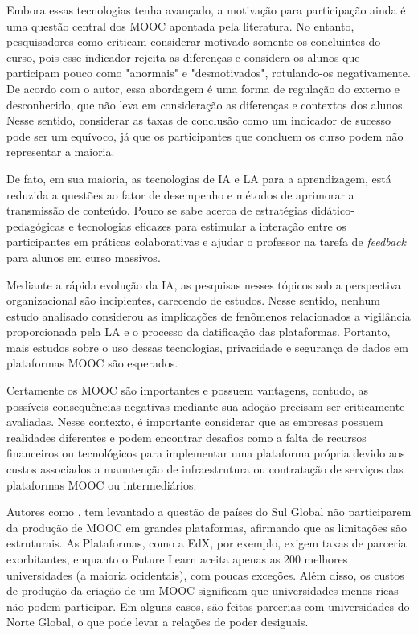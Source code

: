 \documentclass[portuguese]{textolivre}
\begin{document}
Embora essas tecnologias tenha avançado, a motivação para participação ainda é uma questão central dos MOOC apontada pela literatura. No entanto, pesquisadores como \cite{knox_beyond_2018} criticam considerar motivado somente os concluintes do curso, pois esse indicador rejeita as diferenças e considera os alunos que participam pouco como "anormais" e "desmotivados", rotulando-os negativamente. De acordo com o autor, essa abordagem é uma forma de regulação do externo e desconhecido, que não leva em consideração as diferenças e contextos dos alunos.  Nesse sentido, considerar as taxas de conclusão como um indicador de sucesso pode ser um equívoco, já que os participantes que concluem os curso podem não representar a maioria.

De fato, em sua maioria, as tecnologias de IA e LA para a aprendizagem, está reduzida a questões ao fator de desempenho e métodos de aprimorar a transmissão de conteúdo. Pouco se sabe acerca de estratégias didático-pedagógicas e tecnologias eficazes para estimular a interação entre os participantes em práticas colaborativas e ajudar o professor na tarefa de \textit{feedback} para alunos em curso massivos. 

Mediante a rápida evolução da IA, as pesquisas nesses tópicos sob a perspectiva organizacional são incipientes, carecendo de estudos.  Nesse sentido, nenhum estudo analisado considerou as implicações de fenômenos relacionados a vigilância proporcionada pela LA e o processo da datificação das plataformas. Portanto, mais estudos sobre o uso dessas tecnologias, privacidade e segurança de dados em plataformas MOOC são esperados.

Certamente os MOOC são importantes e possuem vantagens, contudo, as possíveis consequências negativas mediante sua adoção precisam ser criticamente avaliadas.  Nesse contexto, é importante considerar que as empresas possuem realidades diferentes e podem encontrar desafios como a falta de recursos financeiros ou tecnológicos para implementar uma plataforma própria devido aos custos associados a manutenção de infraestrutura ou contratação de serviços das plataformas MOOC ou intermediários.

Autores como \textcite{adam_digital_2019}, tem levantado a questão de países do Sul Global não participarem da produção de MOOC em grandes plataformas, afirmando que as limitações são estruturais. As Plataformas, como a EdX, por exemplo, exigem taxas de parceria exorbitantes, enquanto o Future Learn aceita apenas as 200 melhores universidades (a maioria ocidentais), com poucas exceções. Além disso, os custos de produção da criação de um MOOC significam que universidades menos ricas não podem participar. Em alguns casos, são feitas parcerias com universidades do Norte Global, o que pode levar a relações de poder desiguais.
\end{document}
